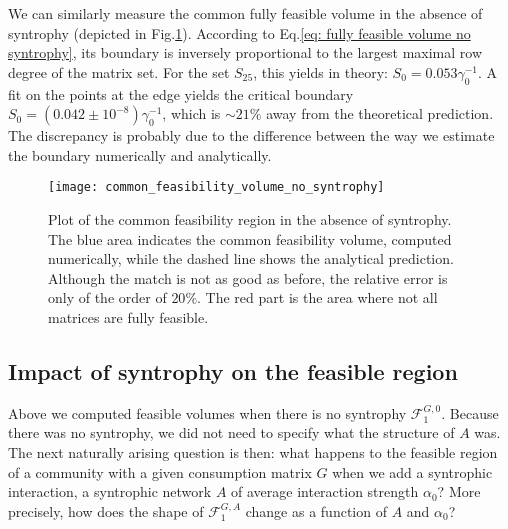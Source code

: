 \documentclass[12pt, titlepage]{report}
\begin{document}
We can similarly measure the common fully feasible volume in the absence of syntrophy %
(depicted in Fig.\ref{fig: common feasible volume no syntrophy}). According to Eq.\eqref{eq: fully feasible volume no syntrophy}, its boundary is inversely proportional to the largest maximal row degree of the matrix set. For the set $S_{25}$, this yields in theory: $S_0 = 0.053 \gamma_0^{-1}$. A fit on the points at the edge yields the critical boundary $S_0 = (0.042 \pm 10^{-8})\gamma_0^{-1}$, which is $\sim 21 \%$ away from the theoretical prediction. The discrepancy is probably due to the difference between the way we estimate the boundary numerically and analytically.
\begin{figure}[h!]
\centering
\texttt{[image: common\_feasibility\_volume\_no\_syntrophy]}
\caption{Plot of the common feasibility region in the absence of syntrophy. The blue area indicates the common feasibility volume, computed numerically, while the dashed line shows the analytical prediction. Although the match is not as good as before, the relative error is only of the order of $20 \%$. The red part is the area where not all matrices are fully feasible.}
\label{fig: common feasible volume no syntrophy}
\end{figure}

\FloatBarrier
\clearpage
\subsection{Impact of syntrophy on the feasible region}\label{sec: impact of syntrophy on feasible region}

Above we computed feasible volumes when there is no syntrophy \ie $\mathcal{F}^{G,0}_1$. Because there was no syntrophy, we did not need to specify what the structure of $A$ was. The next naturally arising question is then: what happens to the feasible region of a community with a given consumption matrix $G$ when we add a syntrophic interaction, \ie a syntrophic network $A$ of average interaction strength $\alpha_0$? More precisely, how does the shape of $\mathcal{F}^{G,A}_1$ change as a function of $A$ and $\alpha_0$?
\end{document}
